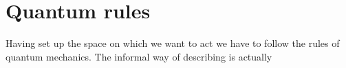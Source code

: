 \section{Quantum rules}
Having set up the space on which we want to act we have to follow the rules of quantum mechanics. The informal way of describing is actually
